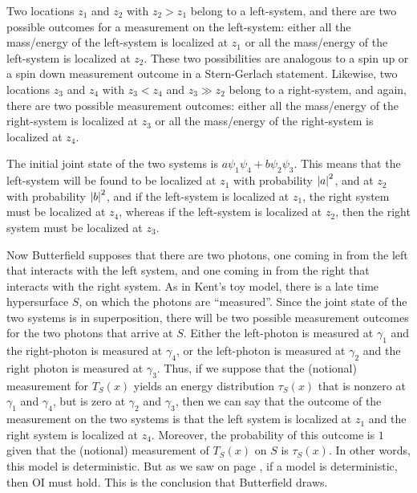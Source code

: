 Two locations $z_1$ and $z_2$ with $z_2>z_1$ belong to a left-system, and there are two possible outcomes for a measurement on the left-system: either all the mass/energy of the left-system is localized at $z_1$ or all the mass/energy of the left-system  is localized at $z_2$. These two possibilities are analogous to a spin up or a spin down measurement outcome in a Stern-Gerlach statement. Likewise, two locations $z_3$ and $z_4$ with $z_3<z_4$ and $z_3\gg z_2$ belong to a right-system, and again, there are two possible measurement outcomes: either all the mass/energy of the right-system is localized at $z_3$ or all the mass/energy of the right-system  is localized at $z_4$. 

The initial joint state of the two systems is 
$a \psi_1\psi_4 +b \psi_2\psi_3.$
This means that the left-system will be found to be localized at $z_1$ with probability $\abs{a}^2$, and at $z_2$ with probability $\abs{b}^2$, and if the left-system is localized at $z_1$, the  right system must be localized at $z_4$, whereas if the left-system is localized at $z_2$, then the right system must be localized at $z_3$.  

Now Butterfield supposes that there are two photons, one coming in from the left that interacts with the left system, and one coming in from the right that interacts with the right system. As in Kent's toy model, there is a late time hypersurface $S$, on which the photons are ``measured''. Since the joint state of the two systems  is in superposition, there will be two possible measurement outcomes for the two photons that arrive at $S$. Either the left-photon is measured at $\gamma_1$ and the right-photon is measured at $\gamma_4$, or the left-photon is measured at $\gamma_2$ and the right photon is measured at $\gamma_3$. Thus, if we suppose that the (notional) measurement for $T_S(x)$ yields an energy distribution $\tau_S(x)$ that is nonzero at $\gamma_1$ and $\gamma_4$, but is zero at $\gamma_2$ and $\gamma_3$, then we can say that the outcome of the measurement on the two systems is that the left system is localized at $z_1$ and the right system is localized at $z_4$. Moreover, the probability of this outcome is $1$ given that the (notional) measurement of $T_S(x)$ on $S$ is $\tau_S(x)$. In other words, this model is deterministic. But as we saw on page \pageref{OIdet}, if a model is deterministic, then OI must hold. This is the conclusion that Butterfield draws. 

